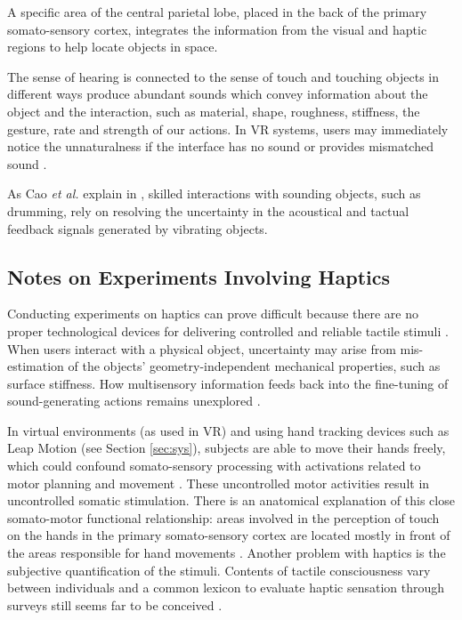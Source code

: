     A specific area of the central parietal lobe, placed in the back of the primary somato-sensory cortex, integrates the information from the visual and haptic regions to help locate objects in space. 
    
    The sense of hearing is connected to the sense of touch and touching objects in different ways produce abundant sounds which convey information about the object and the interaction, such as material, shape, roughness, stiffness, the gesture, rate and strength of our actions. In VR systems, users may immediately notice the unnaturalness if the interface has no sound or provides mismatched sound \cite{Liu:2008}.
    
    As Cao \emph{et al.} explain in  \cite{Cao:2016}, skilled interactions with sounding objects, such as drumming, rely on resolving the uncertainty in the acoustical and tactual feedback signals generated by vibrating objects. 
    
    \subsection{Notes on Experiments Involving Haptics}
    Conducting experiments on haptics can prove difficult because there are no proper technological devices for delivering controlled and reliable tactile stimuli \cite{Gallace2012}. 
    When users interact with a physical object, uncertainty may arise from mis-estimation of the objects’ geometry-independent mechanical properties, such as surface stiffness. How multisensory information feeds back into the fine-tuning of sound-generating actions remains unexplored \cite{Cao:2016}. 
    
    In virtual environments (as used in VR) and using hand tracking devices such as Leap Motion \cite{leapwebsite} (see Section \ref{sec:sys}), subjects are able to move their hands freely, which could confound somato-sensory processing with activations related to motor planning and movement \cite{Bodegard2001}. These uncontrolled motor activities result in uncontrolled somatic stimulation. There is an anatomical explanation of this close somato-motor functional relationship: areas involved in the perception of touch on the hands in the primary somato-sensory cortex are located mostly in front of the areas responsible for hand movements \cite{Penfield1950}.
    Another problem with haptics is the subjective quantification of the stimuli. Contents of tactile consciousness vary between individuals and a common lexicon to evaluate haptic sensation through surveys still seems far to be conceived \cite{Gallace2010}.
    
